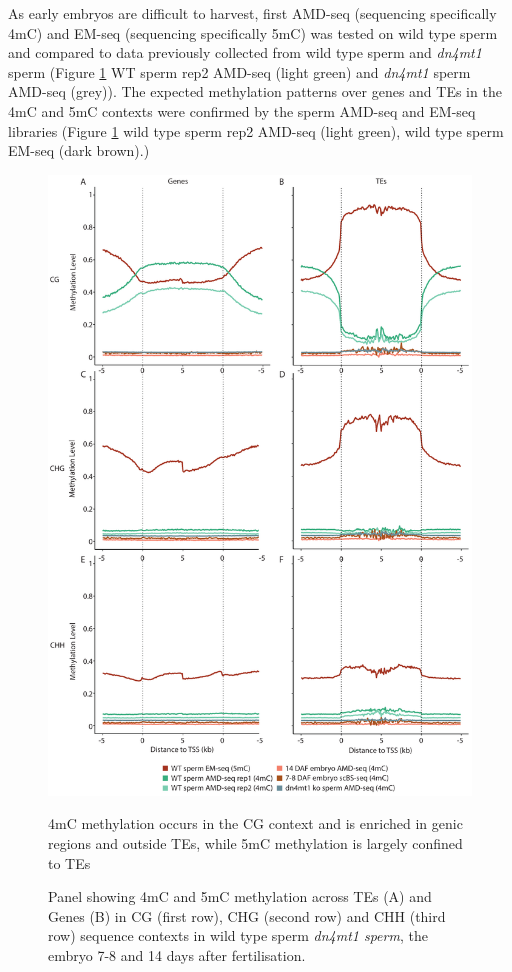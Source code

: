 As early embryos are difficult to harvest, first AMD-seq (sequencing specifically 4mC) and EM-seq (sequencing specifically 5mC) was tested on wild type sperm and compared to data previously collected from wild type sperm and \textit{dn4mt1} sperm (Figure \ref{fig:ends_analysis} WT sperm rep2 AMD-seq (light green) and \textit{dn4mt1} sperm AMD-seq (grey)). The expected methylation patterns over genes and TEs in the 4mC and 5mC contexts were confirmed by the sperm AMD-seq and EM-seq libraries (Figure \ref{fig:ends_analysis} wild type sperm rep2 AMD-seq (light green), wild type sperm EM-seq (dark brown).) 

\begin{figure}[htbp!] 
\centering    
    \includegraphics[width=1\textwidth]{Chapter3/Figs/Figure2_ends_analysis.pdf}
\caption{4mC methylation occurs in the CG context and is enriched in genic regions and outside TEs, while 5mC methylation is largely confined to TEs}
\label{fig:ends_analysis}
\captionsetup{font=small}
    \caption*{Panel showing 4mC and 5mC methylation across TEs (A) and Genes (B) in CG (first row), CHG (second row) and CHH (third row) sequence contexts in wild type sperm \textit{dn4mt1 sperm}, the embryo 7-8 and 14 days after fertilisation.}
\end{figure}

